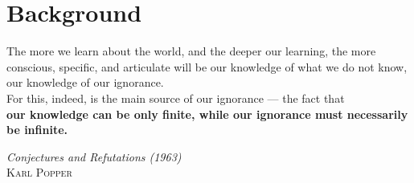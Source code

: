 \chapter{Background}
\vspace*{\fill}
\epigraph{The more we learn about the world, and the deeper our learning, the more conscious, specific, and articulate will be our knowledge of what we do not know, our knowledge of our ignorance.\\ For this, indeed, is the main source of our ignorance — the fact that\\ \textbf{our knowledge can be only finite, while our ignorance must necessarily be infinite.}}%
{\textit{Conjectures and Refutations (1963)}\\ \textsc{Karl Popper}}
\clearpage{\thispagestyle{empty}\cleardoublepage}

